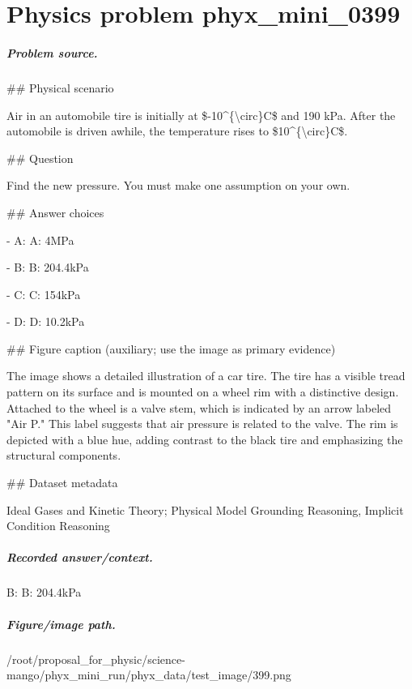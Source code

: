 
\chapter{Physics problem phyx\_mini\_0399}
\label{ch:PhyXMiniProblems_problem_phyx_mini_0399}

\paragraph{Problem source.}
\#\# Physical scenario

Air in an automobile tire is initially at \$-10\textasciicircum{}\{\textbackslash{}circ\}C\$ and 190 kPa. After the automobile is driven awhile, the temperature rises to \$10\textasciicircum{}\{\textbackslash{}circ\}C\$.

\#\# Question

Find the new pressure. You must make one assumption on your own.

\#\# Answer choices

- A: A: 4MPa

- B: B: 204.4kPa

- C: C: 154kPa

- D: D: 10.2kPa

\#\# Figure caption (auxiliary; use the image as primary evidence)

The image shows a detailed illustration of a car tire. The tire has a visible tread pattern on its surface and is mounted on a wheel rim with a distinctive design. Attached to the wheel is a valve stem, which is indicated by an arrow labeled "Air P." This label suggests that air pressure is related to the valve. The rim is depicted with a blue hue, adding contrast to the black tire and emphasizing the structural components.

\#\# Dataset metadata

Ideal Gases and Kinetic Theory; Physical Model Grounding Reasoning, Implicit Condition Reasoning

\paragraph{Recorded answer/context.}
B: B: 204.4kPa

\paragraph{Figure/image path.}
/root/proposal\_for\_physic/science-mango/phyx\_mini\_run/phyx\_data/test\_image/399.png

